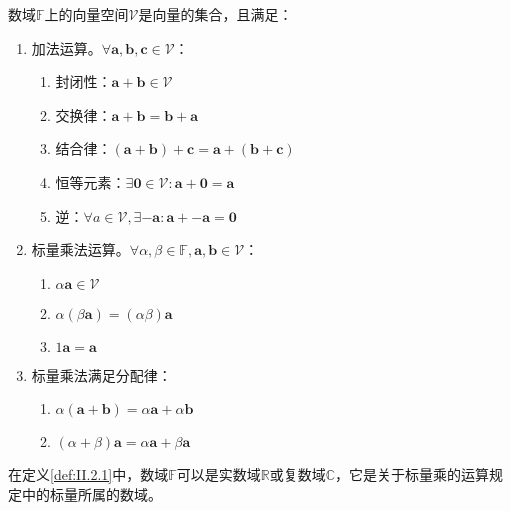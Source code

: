 \documentclass[main.tex]{subfiles}
\begin{document}
\begin{definition}[向量空间]\label{def:II.2.1}
数域$\mathbb{F}$上的向量空间$\mathcal{V}$是向量的集合，且满足：
\begin{enumerate}
\item 加法运算。$\forall\mathbf{a},\mathbf{b},\mathbf{c}\in \mathcal{V}$：
\begin{enumerate}
    \item 封闭性：$\mathbf{a}+\mathbf{b}\in\mathcal{V}$
    \item 交换律：$\mathbf{a}+\mathbf{b}=\mathbf{b}+\mathbf{a}$
    \item 结合律：$\left(\mathbf{a}+\mathbf{b}\right)+\mathbf{c}=\mathbf{a}+\left(\mathbf{b}+\mathbf{c}\right)$
    \item 恒等元素：$\exists \bm{0}\in\mathcal{V}:\mathbf{a}+\bm{0}=\mathbf{a}$
    \item 逆：$\forall a\in\mathcal{V},\exists -\mathbf{a}:\mathbf{a}+-\mathbf{a}=\bm{0}$
\end{enumerate}
\item 标量乘法运算。$\forall\alpha,\beta\in\mathbb{F},\mathbf{a},\mathbf{b}\in\mathcal{V}$：
\begin{enumerate}
    \item $\alpha\mathbf{a}\in\mathcal{V}$
    \item $\alpha\left(\beta\mathbf{a}\right)=\left(\alpha\beta\right)\mathbf{a}$
    \item $1\mathbf{a}=\mathbf{a}$
\end{enumerate}
\item 标量乘法满足分配律：
\begin{enumerate}
    \item $\alpha\left(\mathbf{a}+\mathbf{b}\right)=\alpha\mathbf{a}+\alpha\mathbf{b}$
    \item $\left(\alpha+\beta\right)\mathbf{a}=\alpha\mathbf{a}+\beta\mathbf{a}$
\end{enumerate}
\end{enumerate}
\end{definition}

在定义\ref{def:II.2.1}中，数域$\mathbb{F}$可以是实数域$\mathbb{R}$或复数域$\mathbb{C}$，它是关于标量乘的运算规定中的标量所属的数域。
\end{document}
